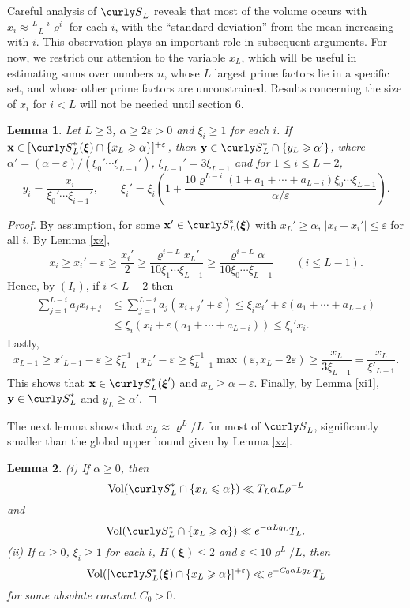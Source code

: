 \documentclass[11pt]{amsart}
\theoremstyle{remark}
\theoremstyle{plain}
\newtheorem{lem}{Lemma}[section]
\numberwithin{equation}{section}
\renewcommand{\a}{\ensuremath{\alpha}}
\newcommand{\eps}{\ensuremath{\varepsilon}}
\renewcommand{\(}{\left(}
\renewcommand{\)}{\right)}
\newcommand{\fancyS}{{\curly S}}
\renewcommand{\le}{\leqslant}
\renewcommand{\ge}{\geqslant}
\renewcommand{\rho}{\varrho}
\newcommand{\bxi}{\boldsymbol\xi}
\newcommand{\vx}{\mathbf{x}}
\newcommand{\bx}{\mathbf{x}}
\newcommand{\vy}{\mathbf{y}}
\DeclareMathOperator{\vvol}{Vol}
\begin{document}
Careful analysis of $\fancyS_L$ reveals that most of the volume occurs
with $x_i \approx \frac{L-i}{L}\rho^i$ for each $i$, with the
``standard deviation'' from the mean increasing with $i$.
This observation plays an important role in subsequent arguments.
For now, we restrict our attention to the variable $x_L$,
which will be useful in estimating sums over numbers $n$, whose $L$
largest prime factors lie in a specific set, and whose other prime factors 
are unconstrained.
Results concerning the size of $x_i$ for $i<L$
will not be needed until section 6. 

\begin{lem}\label{SLxieps}
 Let $L\ge 3$, $\a \ge 2\eps > 0$ and $\xi_i\ge 1$ for each $i$.  
If $\vx \in [ \fancyS_L^*(\bxi) \cap \{ x_L \ge \a \}]^{+\eps}$, then
$\vy \in \fancyS_L^* \cap \{y_L \ge \a' \}$, where
$\a'=(\a-\eps)/(\xi_0'\cdots \xi_{L-1}')$, $\xi_{L-1}'=3\xi_{L-1}$ and
for $1\le i\le L-2$,
\[
 y_i=\frac{x_i}{\xi_0'\cdots \xi_{i-1}'}, 
\qquad \xi_i' = \xi_i\(1 + \frac{10\rho^{L-i}(1+a_1+\cdots+a_{L-i})\xi_0
\cdots \xi_{L-1}}{\a/\eps}\).
\]
\end{lem}

\begin{proof}
 By assumption, for some $\bx' \in \fancyS_L^*(\bxi)$ with $x_L'\ge \a$, 
$|x_i-x_i'|\le \eps$ for all $i$.  By Lemma \ref{xz},
\[
 x_i \ge x_i'-\eps \ge \frac{x_i'}{2} \ge \frac{\rho^{i-L} x_L'}{10\xi_1\cdots \xi_{L-1}}
\ge \frac{\rho^{i-L}\a}{10\xi_0\cdots \xi_{L-1}} \qquad (i\le L-1).
\]
Hence, by $(I_i)$, if $i\le L-2$ then
\begin{align*}
 \sum_{j=1}^{L-i} a_j x_{i+j} &\le \sum_{j=1}^{L-i} a_j(x_{i+j}'+\eps)  \le \xi_i x_i' + 
\eps(a_1+\cdots+a_{L-i}) \\
&\le \xi_i(x_i+\eps(a_1+\cdots+a_{L-i})) \le \xi_i' x_i.
\end{align*}
Lastly, 
\[
 x_{L-1} \ge x'_{L-1}-\eps \ge \xi_{L-1}^{-1} x_L' - \eps \ge
\xi_{L-1}^{-1} \max(\eps,x_L-2\eps) \ge \frac{x_L}{3\xi_{L-1}}=\frac{x_L}{\xi'_{L-1}}.
\]
This shows that $\vx \in \fancyS_L^*(\bxi')$ and $x_L\ge \a-\eps$.  Finally, 
by Lemma \ref{xi1}, $\vy \in \fancyS_L^*$ and $y_L\ge \a'$.
\end{proof}


The next lemma shows that $x_L \approx \rho^L/L$ for most of
$\fancyS_L$, significantly smaller than the global upper
bound given by Lemma \ref{xz}.

\begin{lem}\label{xL most}
(i) If $\a\ge 0$, then
\[
 \vvol(\fancyS_L^* \cap \{x_L\le \a\}) \ll T_L \a L \rho^{-L}
\]
and
\[
 \vvol(\fancyS_L^* \cap \{x_L\ge \a\}) \ll e^{-\a L g_L} T_L.
\]
(ii) If $\a\ge 0$, $\xi_i\ge 1$ for each $i$, $H(\bxi)\le 2$ and
$\eps \le 10 \rho^L/L$, then
\[
 \vvol([\fancyS_L^*(\bxi) \cap \{x_L\ge \a\}]^{+\eps}) \ll e^{- C_0 \a L g_L} T_L
\]
for some absolute constant $C_0>0$.
\end{lem}
\end{document}
